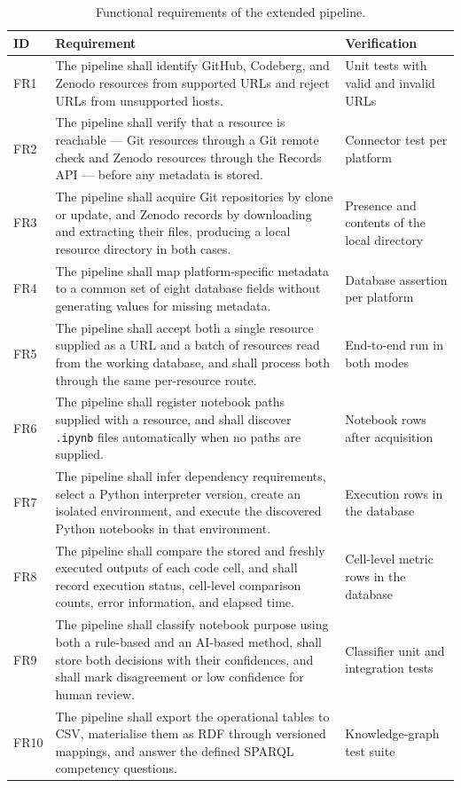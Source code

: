 \begin{table}[H]
\centering
\caption{Functional requirements of the extended pipeline.}
\label{tab:functional-requirements}
\small
\begin{tabularx}{\textwidth}{@{}p{0.9cm}p{9.5cm}p{2.2cm}@{}}
\toprule
ID & Requirement & Verification\tabularnewline
\midrule
FR1 & The pipeline shall identify GitHub, Codeberg, and Zenodo resources from supported URLs and reject URLs from unsupported hosts. & Unit tests with valid and invalid URLs\tabularnewline
FR2 & The pipeline shall verify that a resource is reachable --- Git resources through a Git remote check and Zenodo resources through the Records API --- before any metadata is stored. & Connector test per platform\tabularnewline
FR3 & The pipeline shall acquire Git repositories by clone or update, and Zenodo records by downloading and extracting their files, producing a local resource directory in both cases. & Presence and contents of the local directory\tabularnewline
FR4 & The pipeline shall map platform-specific metadata to a common set of eight database fields without generating values for missing metadata. & Database assertion per platform\tabularnewline
FR5 & The pipeline shall accept both a single resource supplied as a URL and a batch of resources read from the working database, and shall process both through the same per-resource route. & End-to-end run in both modes\tabularnewline
FR6 & The pipeline shall register notebook paths supplied with a resource, and shall discover \texttt{.ipynb} files automatically when no paths are supplied. & Notebook rows after acquisition\tabularnewline
FR7 & The pipeline shall infer dependency requirements, select a Python interpreter version, create an isolated environment, and execute the discovered Python notebooks in that environment. & Execution rows in the database\tabularnewline
FR8 & The pipeline shall compare the stored and freshly executed outputs of each code cell, and shall record execution status, cell-level comparison counts, error information, and elapsed time. & Cell-level metric rows in the database\tabularnewline
FR9 & The pipeline shall classify notebook purpose using both a rule-based and an AI-based method, shall store both decisions with their confidences, and shall mark disagreement or low confidence for human review. & Classifier unit and integration tests\tabularnewline
FR10 & The pipeline shall export the operational tables to CSV, materialise them as RDF through versioned mappings, and answer the defined SPARQL competency questions. & Knowledge-graph test suite\tabularnewline
\bottomrule
\end{tabularx}
\end{table}

